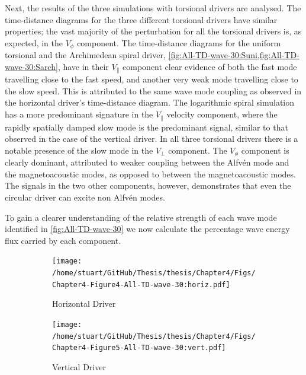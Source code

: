 \documentclass[a4paper,12pt,fourier,authoryear,custommargin]{Classes/PhDThesisPSnPDF}
\begin{document}
Next, the results of the three simulations with torsional drivers are analysed.
The time-distance diagrams for the three different torsional drivers have similar properties; the vast majority of the perturbation for all the torsional drivers is, as expected, in the $V_\phi$ component.
The time-distance diagrams for the uniform torsional and the Archimedean spiral driver, \cref{fig:All-TD-wave-30:Suni,fig:All-TD-wave-30:Sarch}, have in their $V_\parallel$ component clear evidence of both the fast mode travelling close to the fast speed, and another very weak mode travelling close to the slow speed.
This is attributed to the same wave mode coupling as observed in the horizontal driver's time-distance diagram.
The logarithmic spiral simulation has a more predominant signature in the $V_\parallel$ velocity component, where the rapidly spatially damped slow mode is the predominant signal, similar to that observed in the case of the vertical driver.
In all three torsional drivers there is a notable presence of the slow mode in the $V_\perp$ component.
The $V_\phi$ component is clearly dominant, attributed to weaker coupling between the Alfv\'en mode and the magnetoacoustic modes, as opposed to between the magnetoacoustic modes.
The signals in the two other components, however, demonstrates that even the circular driver can excite non Alfv\'en modes.

To gain a clearer understanding of the relative strength of each wave mode identified in \cref{fig:All-TD-wave-30} we now calculate the percentage wave energy flux carried by each component.




\begin{figure}
    \centering
    

    \begin{subfigure}[b]{0.9\columnwidth}
        \texttt{[image: /home/stuart/GitHub/Thesis/thesis/Chapter4/Figs/Chapter4-Figure4-All-TD-wave-30:horiz.pdf]}
        \caption{Horizontal Driver}
        \label{fig:All-TD-wave-30:horiz}
    \end{subfigure}

    \begin{subfigure}[b]{0.9\columnwidth}
        \texttt{[image: /home/stuart/GitHub/Thesis/thesis/Chapter4/Figs/Chapter4-Figure5-All-TD-wave-30:vert.pdf]}
        \caption{Vertical Driver}
        \label{fig:All-TD-wave-30:vert}
    \end{subfigure}
    \caption{}
    \label{fig:}
\end{figure}
\end{document}
